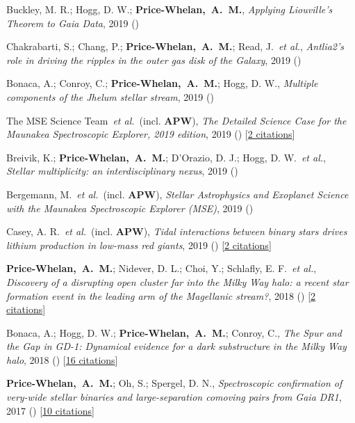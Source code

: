 \item[{\color{deemph}\scriptsize10}]Buckley, M. R.; Hogg, D. W.; \textbf{Price-Whelan,~A.~M.}, \textit{Applying Liouville's Theorem to Gaia Data}, 2019 ()

\item[{\color{deemph}\scriptsize9}]Chakrabarti, S.; Chang, P.; \textbf{Price-Whelan,~A.~M.}; Read, J.~\textit{et al.}, \textit{Antlia2's role in driving the ripples in the outer gas disk of the Galaxy}, 2019 ()

\item[{\color{deemph}\scriptsize8}]Bonaca, A.; Conroy, C.; \textbf{Price-Whelan,~A.~M.}; Hogg, D. W., \textit{Multiple components of the Jhelum stellar stream}, 2019 ()

\item[{\color{deemph}\scriptsize7}]The MSE Science Team~\textit{et al.}~(incl. \textbf{APW}), \textit{The Detailed Science Case for the Maunakea Spectroscopic Explorer, 2019 edition}, 2019 () [\href{http://adsabs.harvard.edu/abs/2019arXiv190404907T}{2 citations}]

\item[{\color{deemph}\scriptsize6}]Breivik, K.; \textbf{Price-Whelan,~A.~M.}; D'Orazio, D. J.; Hogg, D. W.~\textit{et al.}, \textit{Stellar multiplicity: an interdisciplinary nexus}, 2019 ()

\item[{\color{deemph}\scriptsize5}]Bergemann, M.~\textit{et al.}~(incl. \textbf{APW}), \textit{Stellar Astrophysics and Exoplanet Science with the Maunakea Spectroscopic Explorer (MSE)}, 2019 ()

\item[{\color{deemph}\scriptsize4}]Casey, A. R.~\textit{et al.}~(incl. \textbf{APW}), \textit{Tidal interactions between binary stars drives lithium production in low-mass red giants}, 2019 () [\href{http://adsabs.harvard.edu/abs/2019arXiv190204102C}{2 citations}]

\item[{\color{deemph}\scriptsize3}]\textbf{Price-Whelan,~A.~M.}; Nidever, D. L.; Choi, Y.; Schlafly, E. F.~\textit{et al.}, \textit{Discovery of a disrupting open cluster far into the Milky Way halo: a recent star formation event in the leading arm of the Magellanic stream?}, 2018 () [\href{http://adsabs.harvard.edu/abs/2018arXiv181105991P}{2 citations}]

\item[{\color{deemph}\scriptsize2}]Bonaca, A.; Hogg, D. W.; \textbf{Price-Whelan,~A.~M.}; Conroy, C., \textit{The Spur and the Gap in GD-1: Dynamical evidence for a dark substructure in the Milky Way halo}, 2018 () [\href{http://adsabs.harvard.edu/abs/2018arXiv181103631B}{16 citations}]

\item[{\color{deemph}\scriptsize1}]\textbf{Price-Whelan,~A.~M.}; Oh, S.; Spergel, D. N., \textit{Spectroscopic confirmation of very-wide stellar binaries and large-separation comoving pairs from Gaia DR1}, 2017 () [\href{http://adsabs.harvard.edu/abs/2017arXiv170903532P}{10 citations}]